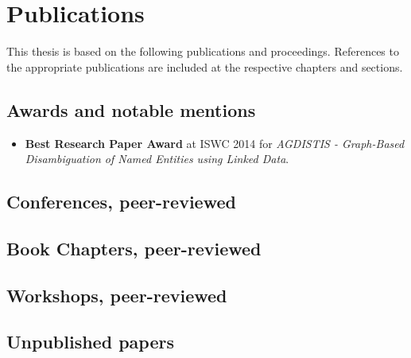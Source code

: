 \chapter*{Publications}

This thesis is based on the following publications and proceedings.
References to the appropriate publications are included at the respective chapters and sections.

\bigskip


\section*{Awards and notable mentions}
\begin{itemize}
    \item \textbf{Best Research Paper Award} at ISWC 2014 for \textit{AGDISTIS - Graph-Based Disambiguation of Named Entities using Linked Data}.
\end{itemize}

\section*{Conferences, peer-reviewed}

\section*{Book Chapters, peer-reviewed}

\section*{Workshops, peer-reviewed}

\section*{Unpublished papers}
